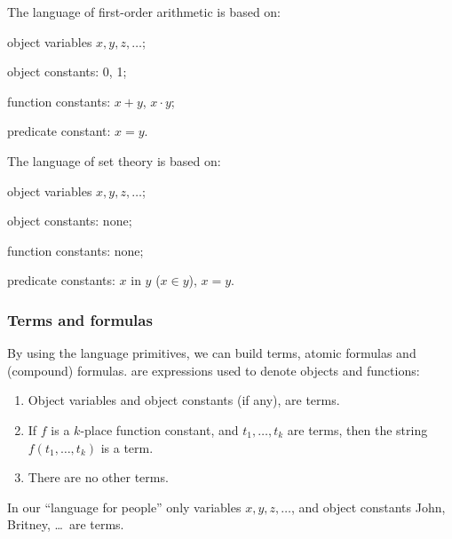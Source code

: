\begin{example}
The language of first-order arithmetic is based on: 

\begin{inparaenum}[(a)]
    \item object variables \(x, y, z, \ldots\);
    \item object constants: 0, 1;
    \item function constants: \(x+y\), \(x\cdot y\);
    \item predicate constant: \(x=y\).
\end{inparaenum}
\end{example}

\begin{example}
The language of set theory is based on:

\begin{inparaenum}[(a)]
    \item object variables \(x, y, z, \ldots\);
    \item object constants: none;
    \item function constants: none;
    \item predicate constants: \(x\) in \(y\) (\(x\in y\)), \(x=y\).
\end{inparaenum}
\end{example}

\subsubsection*{Terms and formulas}

By using the language primitives, we can build terms, atomic formulas and (compound) formulas.
 are expressions used to denote objects and functions:

\begin{enumerate}
    \item Object variables and object constants (if any), are terms.
    \item If \(f\) is a \(k\)-place function constant, and \(t_1,\ldots,t_k\) are terms, then the string \(f(t_1,\ldots,t_k)\) is a term.
    \item There are no other terms.
\end{enumerate}

\begin{example}
In our ``language for people'' only variables \(x, y, z, \ldots\), and object constants John, Britney, \ldots\ are terms.
\end{example}

